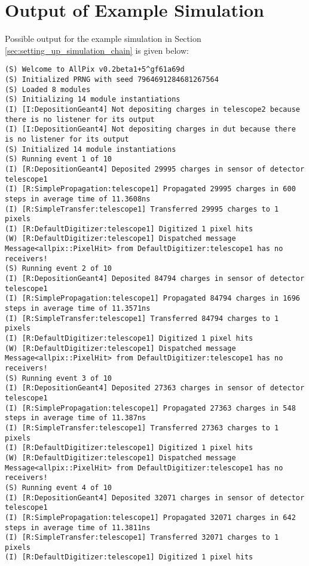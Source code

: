 \section{Output of Example Simulation}
\label{sec:example_output}
Possible output for the example simulation in Section \ref{sec:setting_up_simulation_chain} is given below:

\begin{lstlisting}[breaklines]
(S) Welcome to AllPix v0.2beta1+5^gf61a69d
(S) Initialized PRNG with seed 7964691284681267564
(S) Loaded 8 modules                        
(S) Initializing 14 module instantiations
(I) [I:DepositionGeant4] Not depositing charges in telescope2 because there is no listener for its output
(I) [I:DepositionGeant4] Not depositing charges in dut because there is no listener for its output
(S) Initialized 14 module instantiations
(S) Running event 1 of 10
(I) [R:DepositionGeant4] Deposited 29995 charges in sensor of detector telescope1
(I) [R:SimplePropagation:telescope1] Propagated 29995 charges in 600 steps in average time of 11.3608ns
(I) [R:SimpleTransfer:telescope1] Transferred 29995 charges to 1 pixels
(I) [R:DefaultDigitizer:telescope1] Digitized 1 pixel hits
(W) [R:DefaultDigitizer:telescope1] Dispatched message Message<allpix::PixelHit> from DefaultDigitizer:telescope1 has no receivers!
(S) Running event 2 of 10
(I) [R:DepositionGeant4] Deposited 84794 charges in sensor of detector telescope1
(I) [R:SimplePropagation:telescope1] Propagated 84794 charges in 1696 steps in average time of 11.3571ns
(I) [R:SimpleTransfer:telescope1] Transferred 84794 charges to 1 pixels
(I) [R:DefaultDigitizer:telescope1] Digitized 1 pixel hits
(W) [R:DefaultDigitizer:telescope1] Dispatched message Message<allpix::PixelHit> from DefaultDigitizer:telescope1 has no receivers!
(S) Running event 3 of 10
(I) [R:DepositionGeant4] Deposited 27363 charges in sensor of detector telescope1
(I) [R:SimplePropagation:telescope1] Propagated 27363 charges in 548 steps in average time of 11.387ns
(I) [R:SimpleTransfer:telescope1] Transferred 27363 charges to 1 pixels
(I) [R:DefaultDigitizer:telescope1] Digitized 1 pixel hits
(W) [R:DefaultDigitizer:telescope1] Dispatched message Message<allpix::PixelHit> from DefaultDigitizer:telescope1 has no receivers!
(S) Running event 4 of 10
(I) [R:DepositionGeant4] Deposited 32071 charges in sensor of detector telescope1
(I) [R:SimplePropagation:telescope1] Propagated 32071 charges in 642 steps in average time of 11.3811ns
(I) [R:SimpleTransfer:telescope1] Transferred 32071 charges to 1 pixels
(I) [R:DefaultDigitizer:telescope1] Digitized 1 pixel hits

\end{lstlisting}

